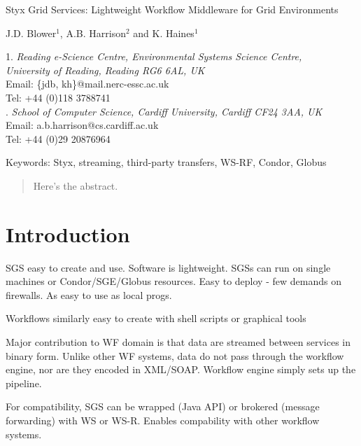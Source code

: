 \documentclass[a4paper]{article}
\begin{document}

\begin{center}
{\Large Styx Grid Services: Lightweight Workflow Middleware for Grid Environments}

\bigskip
\bigskip

{\large J.D. Blower$^{1}$, A.B. Harrison$^{2}$ and K. Haines$^{1}$}

\bigskip

{\small 1. \textit{Reading e-Science Centre, Environmental Systems Science Centre, \\
University of Reading, Reading RG6 6AL, UK} \\
Email: \{jdb, kh\}@mail.nerc-essc.ac.uk\\
Tel: +44 (0)118 3788741 \\
. \textit{School of Computer Science, Cardiff University, Cardiff CF24 3AA, UK}\\
Email: a.b.harrison@cs.cardiff.ac.uk\\
Tel: +44 (0)29 20876964}

\bigskip
\bigskip

Keywords: Styx, streaming, third-party transfers, WS-RF, Condor, Globus

\end{center}


\begin{abstract}
Here's the abstract.
\end{abstract}

\section{Introduction}
SGS easy to create and use.  Software is lightweight. SGSs can run on single machines or Condor/SGE/Globus resources.  Easy to deploy - few demands on firewalls.  As easy to use as local progs.

Workflows similarly easy to create with shell scripts or graphical tools

Major contribution to WF domain is that data are streamed between services in binary form.  Unlike other WF systems, data do not pass through the workflow engine, nor are they encoded in XML/SOAP.  Workflow engine simply sets up the pipeline.

For compatibility, SGS can be wrapped (Java API) or brokered (message forwarding) with WS or WS-R.  Enables compability with other workflow systems.
\end{document}
